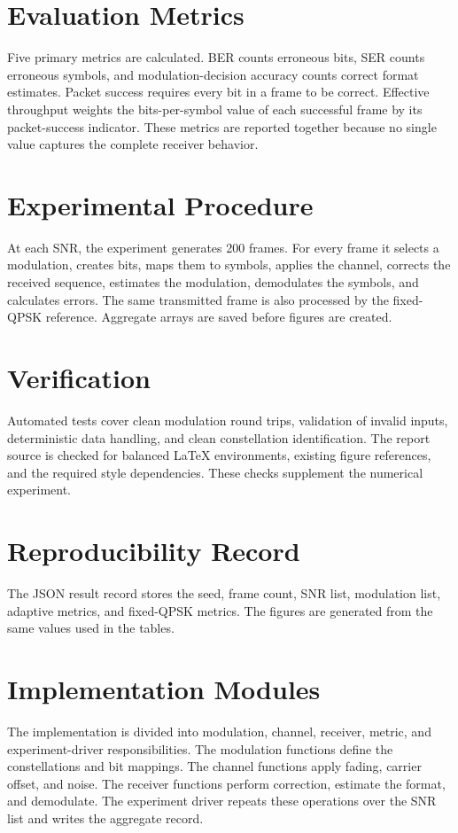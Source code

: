 \documentclass[12pt,twoside,openright]{report}
\begin{document}
\section{Evaluation Metrics}
Five primary metrics are calculated. BER counts erroneous bits, SER counts
erroneous symbols, and modulation-decision accuracy counts correct format
estimates. Packet success requires every bit in a frame to be correct.
Effective throughput weights the bits-per-symbol value of each successful
frame by its packet-success indicator. These metrics are reported together
because no single value captures the complete receiver behavior.

\section{Experimental Procedure}
At each SNR, the experiment generates 200 frames. For every frame it
selects a modulation, creates bits, maps them to symbols, applies the channel,
corrects the received sequence, estimates the modulation, demodulates the
symbols, and calculates errors. The same transmitted frame is also processed
by the fixed-QPSK reference. Aggregate arrays are saved before figures are
created.

\section{Verification}
Automated tests cover clean modulation round trips, validation of invalid
inputs, deterministic data handling, and clean constellation identification.
The report source is checked for balanced LaTeX environments, existing
figure references, and the required style dependencies. These checks
supplement the numerical experiment.

\section{Reproducibility Record}
The JSON result record stores the seed, frame count, SNR list, modulation
list, adaptive metrics, and fixed-QPSK metrics. The figures are generated
from the same values used in the tables.

\section{Implementation Modules}
The implementation is divided into modulation, channel, receiver, metric,
and experiment-driver responsibilities. The modulation functions define the
constellations and bit mappings. The channel functions apply fading, carrier
offset, and noise. The receiver functions perform correction, estimate the
format, and demodulate. The experiment driver repeats these operations over
the SNR list and writes the aggregate record.
\end{document}
